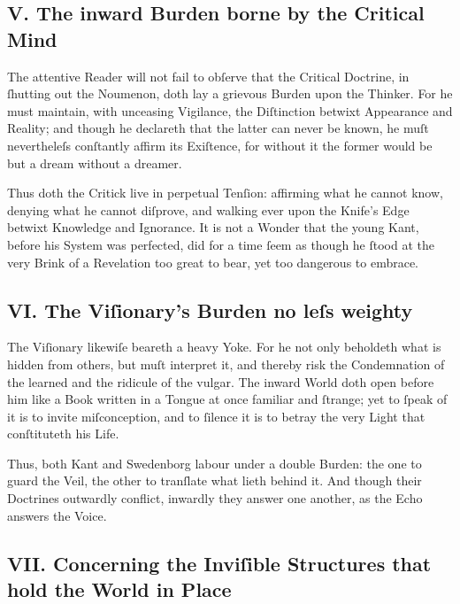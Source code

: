 \documentclass[12pt]{article}
\begin{document}
\subsection*{V. The inward Burden borne by the Critical Mind}

The attentive Reader will not fail to obſerve that the Critical Doctrine, in 
ſhutting out the Noumenon, doth lay a grievous Burden upon the Thinker. For he 
must maintain, with unceasing Vigilance, the Diſtinction betwixt Appearance 
and Reality; and though he declareth that the latter can never be known, he 
muſt nevertheleſs conſtantly affirm its Exiſtence, for without it the former 
would be but a dream without a dreamer.

Thus doth the Critick live in perpetual Tenſion: affirming what he cannot know, 
denying what he cannot diſprove, and walking ever upon the Knife’s Edge 
betwixt Knowledge and Ignorance. It is not a Wonder that the young Kant, 
before his System was perfected, did for a time ſeem as though he ſtood at the 
very Brink of a Revelation too great to bear, yet too dangerous to embrace.

\subsection*{VI. The Viſionary’s Burden no leſs weighty}

The Viſionary likewiſe beareth a heavy Yoke. For he not only beholdeth what is 
hidden from others, but muſt interpret it, and thereby risk the Condemnation 
of the learned and the ridicule of the vulgar. The inward World doth open 
before him like a Book written in a Tongue at once familiar and ſtrange; yet 
to ſpeak of it is to invite miſconception, and to ſilence it is to betray the 
very Light that conſtituteth his Life.

Thus, both Kant and Swedenborg labour under a double Burden: the one to guard 
the Veil, the other to tranſlate what lieth behind it. And though their 
Doctrines outwardly conflict, inwardly they answer one another, as the Echo 
answers the Voice.

\subsection*{VII. Concerning the Inviſible Structures that hold the World in Place}
\end{document}

